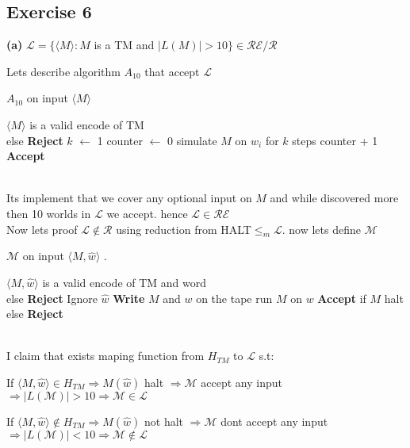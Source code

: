 \documentclass[12pt]{article}
\begin{document}
\subsection{Exercise 6}
\begin{center}
\textbf{(a)} $\mathcal{L} = \{\langle M\rangle : M $ is a TM and $|L(M)| > 10\} \in  \mathcal{RE/R}$
\end{center} 

Lets describe algorithm $A_{10}$ that accept $\mathcal{L}$
\begin{algorithm}
\caption{  $A_{10}$ on input $\langle M\rangle$ }\label{alg:cap}
\begin{algorithmic}
\Require $\langle M\rangle$ is a valid encode of TM\\ else \textbf{Reject} 
\State $k$ $\leftarrow$ 1
\State counter $\leftarrow$ 0
\State  simulate $M$ on $w_i$
for $k$ steps
\State counter + 1
\EndIf
\EndFor
{} \textbf{Accept}
\EndIf
\EndWhile
\end{algorithmic}
\end{algorithm}
\\Its implement that we cover any optional input on $M$ and while discovered more then 10 worlds in $\mathcal{L}$ we accept. hence $\mathcal{L} \in \mathcal{RE}$
\\Now  lets proof $\mathcal{L}\notin \mathcal{R}$ using reduction from HALT$\leq_m \mathcal{L}$. now lets define $\mathcal{M}$ 
\begin{algorithm}
\caption{ $\mathcal{M}$ on input $\langle M,\hat{w}\rangle$ .}\label{alg:cap}
\begin{algorithmic}
\Require $\langle M,\hat{w}\rangle$ is a valid encode of TM and word\\ else \textbf{Reject} 
\State Ignore $\hat{w}$
\State \textbf{Write} $M$ and $w$ on the tape
\State run $M$ on $w$ \textbf{Accept} if $M$ halt
\\ else \textbf{Reject}
\end{algorithmic}
\end{algorithm}
\\I claim that exists maping function from $H_{TM}$ to $\mathcal{L}$   s.t:
\begin{list}{•}{}
\item If $\langle M,\hat{w}\rangle \in H_{TM} \Rightarrow M(\hat{w})$ halt $\Rightarrow\mathcal{M}$ accept any input $ \Rightarrow  |L(\mathcal{M})|>10\Rightarrow \mathcal{M}\in \mathcal{L} $
\item If $\langle M,\hat{w}\rangle \notin H_{TM} \Rightarrow M(\hat{w})$ not halt $\Rightarrow\mathcal{M}$ dont  accept any input $ \Rightarrow  |L(\mathcal{M})|<10\Rightarrow \mathcal{M}\notin \mathcal{L} $
\end{list}
\end{document}
